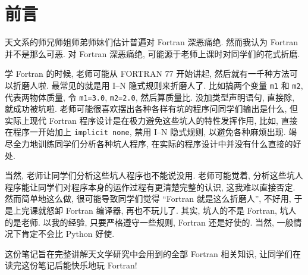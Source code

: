 \chapter*{前言}

天文系的师兄师姐师弟师妹们估计普遍对 Fortran 深恶痛绝. 然而我认为 Fortran 并不是那么可恶. 对 Fortran 深恶痛绝, 可能源于老师上课时对同学们的花式折磨.

学 Fortran 的时候, 老师可能从 FORTRAN 77 开始讲起, 然后就有一千种方法可以折磨人啦. 最常见的就是用 I--N 隐式规则来折磨人了. 比如搞两个变量 \texttt{m1} 和 \texttt{m2}, 代表两物体质量, 令 \texttt{m1=3.0}, \texttt{m2=2.0}, 然后算质量比. 没加类型声明语句, 直接除, 就成功被坑啦. 老师可能很喜欢摆出各种各样有坑的程序问同学们输出是什么, 但实际上现代 Fortran 程序设计是在极力避免这些坑人的特性发挥作用, 比如, 直接在程序一开始加上 \texttt{implicit none}, 禁用 I--N 隐式规则, 以避免各种麻烦出现. 竭尽全力地训练同学们分析各种坑人程序, 在实际的程序设计中并没有什么直接的好处.

当然, 老师让同学们分析这些坑人程序也不能说没用. 老师可能觉着, 分析这些坑人程序能让同学们对程序本身的运作过程有更清楚完整的认识, 这我难以直接否定. 然而简单地这么做, 很可能导致同学们觉得 ``Fortran 就是这么折磨人'', 不好用, 于是上完课就怒卸 Fortran 编译器, 再也不玩儿了. 其实, 坑人的不是 Fortran, 坑人的是老师. 以我的经验, 只要严格遵守一些规则, Fortran 还是好使的. 当然, 一般情况下肯定不会比 Python 好使.

这份笔记旨在完整讲解天文学研究中会用到的全部 Fortran 相关知识, 让同学们在读完这份笔记后能快乐地玩 Fortran!
